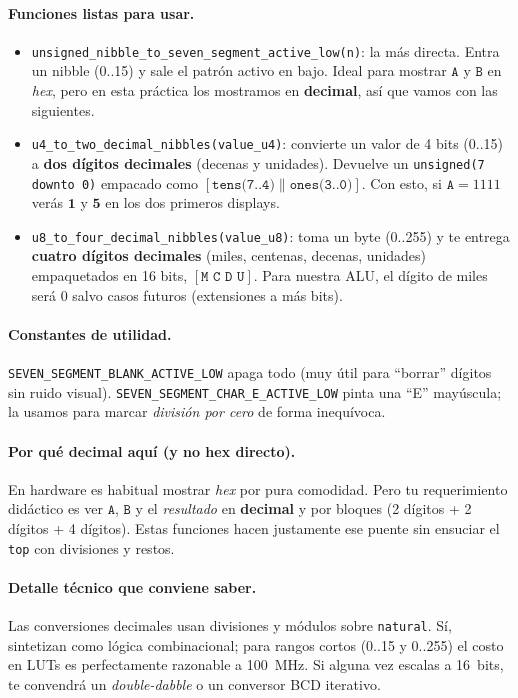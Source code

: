 \documentclass[a4paper,12pt]{article}
\begin{document}
\paragraph{Funciones listas para usar.}
\begin{itemize}
  \item \texttt{unsigned\_nibble\_to\_seven\_segment\_active\_low(n)}: la más directa. Entra un nibble (0..15) y sale el patrón activo en bajo. Ideal para mostrar \(\texttt{A}\) y \(\texttt{B}\) en \emph{hex}, pero en esta práctica los mostramos en \textbf{decimal}, así que vamos con las siguientes.
  \item \texttt{u4\_to\_two\_decimal\_nibbles(value\_u4)}: convierte un valor de 4 bits (0..15) a \textbf{dos dígitos decimales} (decenas y unidades). Devuelve un \texttt{unsigned(7 downto 0)} empacado como \([\texttt{tens(7..4)} \| \texttt{ones(3..0)}]\). Con esto, si \(\texttt{A}=1111\) verás \(\textbf{1}\) y \(\textbf{5}\) en los dos primeros displays.
  \item \texttt{u8\_to\_four\_decimal\_nibbles(value\_u8)}: toma un byte (0..255) y te entrega \textbf{cuatro dígitos decimales} (miles, centenas, decenas, unidades) empaquetados en 16 bits, \([\texttt{M C D U}]\). Para nuestra ALU, el dígito de miles será 0 salvo casos futuros (extensiones a más bits).
\end{itemize}

\paragraph{Constantes de utilidad.}
\texttt{SEVEN\_SEGMENT\_BLANK\_ACTIVE\_LOW} apaga todo (muy útil para “borrar” dígitos sin ruido visual).  
\texttt{SEVEN\_SEGMENT\_CHAR\_E\_ACTIVE\_LOW} pinta una “E” mayúscula; la usamos para marcar \emph{división por cero} de forma inequívoca.

\paragraph{Por qué decimal aquí (y no hex directo).}
En hardware es habitual mostrar \emph{hex} por pura comodidad. Pero tu requerimiento didáctico es ver \(\texttt{A}\), \(\texttt{B}\) y el \emph{resultado} en \textbf{decimal} y por bloques (2 dígitos + 2 dígitos + 4 dígitos). Estas funciones hacen justamente ese puente sin ensuciar el \texttt{top} con divisiones y restos.

\paragraph{Detalle técnico que conviene saber.}
Las conversiones decimales usan divisiones y módulos sobre \texttt{natural}. Sí, sintetizan como lógica combinacional; para rangos cortos (0..15 y 0..255) el costo en LUTs es perfectamente razonable a 100~MHz. Si alguna vez escalas a 16~bits, te convendrá un \emph{double-dabble} o un conversor BCD iterativo.
\end{document}
